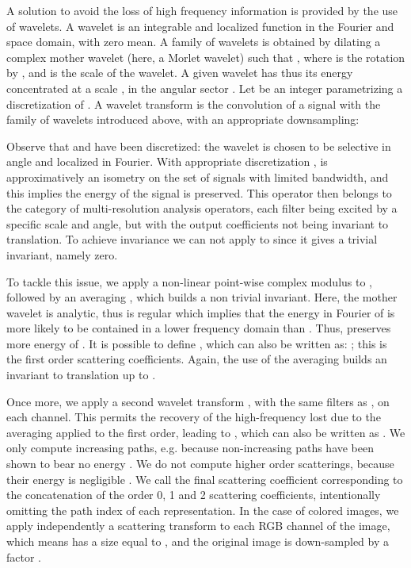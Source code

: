 \documentclass[10pt,twocolumn,letterpaper]{article}
\newcommand{\citep}{\cite}
\begin{document}
A solution to avoid the loss of high frequency information is provided by the use of wavelets. A wavelet is an integrable and localized function in the Fourier and space domain, with zero mean. A family of wavelets is obtained by dilating a complex mother wavelet  (here, a Morlet wavelet) such that , where  is the rotation by , and  is the scale of the wavelet. A given wavelet  has thus its energy concentrated at a scale , in the angular sector . Let  be an integer parametrizing a discretization of . A wavelet transform is the convolution of a signal with the family of wavelets introduced above, with an appropriate downsampling:

Observe that  and  have been discretized: the wavelet is chosen to be selective in angle and localized in Fourier. 
With appropriate discretization \cite{oyallon2015deep},  is approximatively an isometry on the set of signals with limited bandwidth, and this implies the energy of the signal is preserved. This operator then belongs to the category of multi-resolution analysis operators, each filter being excited by a specific scale and angle, but with the output coefficients not being invariant to translation. To achieve invariance we can not apply  to  since it gives a trivial invariant, namely zero.



To tackle this issue, we apply a non-linear point-wise complex modulus to , followed by an averaging , which builds a non trivial invariant. Here, the mother wavelet is analytic, thus  is  regular \citep{bernstein2013generalized} which implies that the energy in Fourier of  is more likely to be contained in a lower frequency domain than . Thus,  preserves more energy of . It is possible to define , which can also be written as: ; this is the first order scattering coefficients. Again, the use of the averaging  builds an invariant to translation up to .

Once more, we apply a second wavelet transform , with the same filters as , on each channel. This permits the recovery of the high-frequency lost due to the averaging applied to the first order, leading to , which can also be written as . We only compute increasing paths, e.g.  because non-increasing paths have been shown to bear no energy \citep{bruna2013invariant}. We do not compute higher order scatterings, because their energy is negligible \citep{bruna2013invariant}. We call  the final scattering coefficient corresponding to the concatenation of the order 0, 1 and 2 scattering coefficients, intentionally omitting the path index of each representation. In the case of colored images, we apply independently a scattering transform to each RGB channel of the image, which means   has a size equal to , and the original image is down-sampled by a factor  \cite{bruna2013invariant}.
\end{document}
